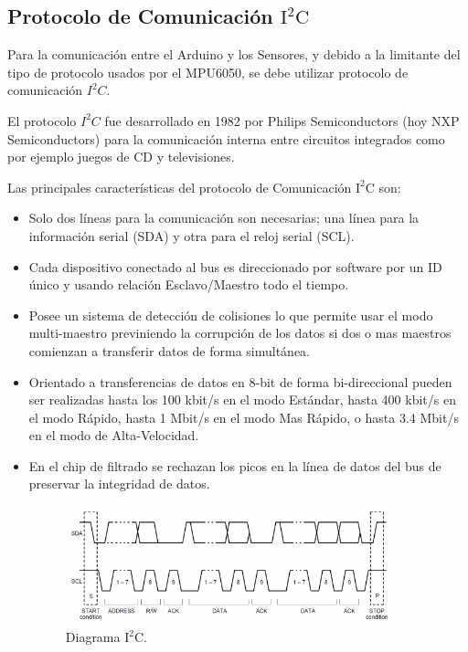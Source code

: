 \documentclass[12pt,a4paper]{article}
\begin{document}
\subsection{Protocolo de Comunicación $\mathbf{\mathrm{I^2C}}$}
Para la comunicación entre el Arduino y los Sensores, y debido a la limitante del tipo de protocolo usados por el MPU6050, se debe utilizar protocolo de comunicación $I^2C$.

El protocolo $I^2C$ fue desarrollado en 1982 por Philips Semiconductors (hoy NXP Semiconductors) para la comunicación interna entre circuitos integrados como por ejemplo juegos de CD y televisiones.

Las principales características del protocolo de Comunicación $\mathrm{I^2C}$ \cite{I2C} son:
\begin{itemize}
	\item Solo dos líneas para la comunicación son necesarias; una línea para la información serial (SDA) y otra para el reloj serial (SCL).
	
	\item Cada dispositivo conectado al bus es direccionado por software por un ID único y usando relación Esclavo/Maestro todo el tiempo.
	
	\item Posee un sistema de detección de colisiones lo que permite usar el modo multi-maestro previniendo la corrupción de los datos si dos o mas maestros comienzan a transferir datos de forma simultánea.
	
	\item Orientado a transferencias de datos en 8-bit de forma bi-direccional pueden ser realizadas hasta los 100 kbit/s en el modo Estándar, hasta 400 kbit/s en el modo Rápido, hasta 1 Mbit/s en el modo Mas Rápido, o hasta 3.4 Mbit/s en el modo de Alta-Velocidad.
	
	\item En el chip de filtrado se rechazan los picos en la línea de datos del bus de preservar la integridad de datos.
	
	\begin{figure}[H]
		\centering
		\includegraphics[width=0.9\textwidth]{images/Diagrama_I2C}
		\caption{Diagrama $\mathrm{I^2C.}$}
		\label{fig:diagramaI2C}
	\end{figure}
\end{itemize}
\end{document}
